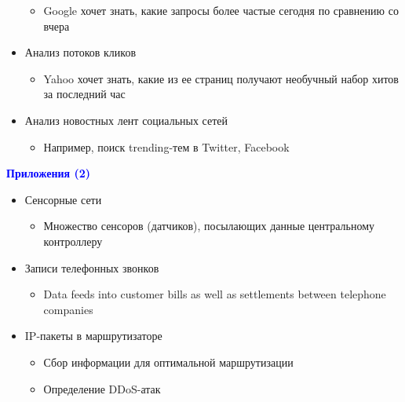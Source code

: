\documentclass[landscape]{slides}
\begin{document}
\begin{normalsize}
\begin{slide}
\begin{itemize}
  \begin{itemize}
  \item Google хочет знать, какие запросы более частые сегодня по сравнению со вчера
  \end{itemize}

\item Анализ потоков кликов

  \begin{itemize}
  \item Yahoo хочет знать, какие из ее страниц получают необучный набор хитов за последний час
  \end{itemize}

\item Анализ новостных лент социальных сетей

  \begin{itemize}
  \item Например, поиск trending-тем в Twitter, Facebook
  \end{itemize}
\end{itemize}
\end{slide}


\begin{slide}
\textbf{\textcolor{blue}{Приложения (2)}}


\begin{itemize}
\item Сенсорные сети

  \begin{itemize}
  \item Множество сенсоров (датчиков), посылающих данные центральному контроллеру
  \end{itemize}

\item Записи телефонных звонков

  \begin{itemize}
  \item Data feeds into customer bills as well as settlements between telephone companies
  \end{itemize}

\item IP-пакеты в маршрутизаторе
  
  \begin{itemize}
  \item Сбор информации для оптимальной маршрутизации

  \item Определение DDoS-атак
  \end{itemize}
\end{itemize}
\end{slide}



\end{normalsize}
\end{document}
